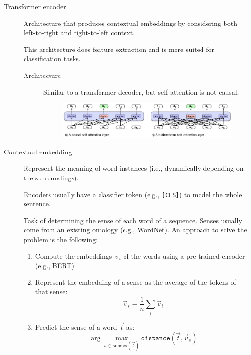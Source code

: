 \begin{description}
    \item[Transformer encoder] 
        Architecture that produces contextual embeddings by considering both left-to-right and right-to-left context.

        \begin{remark}
            This architecture does feature extraction and is more suited for classification tasks.
        \end{remark}

        \begin{description}
            \item[Architecture]
                Similar to a transformer decoder, but self-attention is not causal.

                \begin{figure}[H]
                    \centering
                    \includegraphics[width=0.75\linewidth]{./img/_decoder_vs_encoder.pdf}
                \end{figure}
        \end{description}

    \item[Contextual embedding] 
        Represent the meaning of word instances (i.e., dynamically depending on the surroundings).

        \begin{remark}
            Encoders usually have a classifier token (e.g., \texttt{[CLS]}) to model the whole sentence.
        \end{remark}

        \begin{example}
            Task of determining the sense of each word of a sequence. Senses usually come from an existing ontology (e.g., WordNet). An approach to solve the problem is the following:
            \begin{enumerate}
                \item Compute the embeddings $\vec{v}_i$ of the words using a pre-trained encoder (e.g., BERT).
                \item Represent the embedding of a sense as the average of the tokens of that sense:
                \[ \vec{v}_s = \frac{1}{n} \sum_i \vec{v}_i \]
                \item Predict the sense of a word $\vec{t}$ as:
                \[ \arg\max_{s \in \texttt{senses}(\vec{t})} \texttt{distance}(\vec{t}, \vec{v}_s) \]
            \end{enumerate}
        \end{example}
\end{description}

